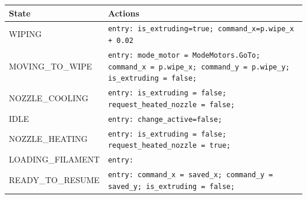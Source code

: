 \begin{tabular}{@{}lp{}@{}}
\toprule
State & Actions \\
\midrule
WIPING & \texttt{entry: is\_extruding=true; command\_x=p.wipe\_x + 0.02} \\
MOVING\_TO\_WIPE & \texttt{entry: mode\_motor = ModeMotors.GoTo; command\_x = p.wipe\_x; command\_y = p.wipe\_y; is\_extruding = false;} \\
NOZZLE\_COOLING & \texttt{entry: is\_extruding = false; request\_heated\_nozzle = false;} \\
IDLE & \texttt{entry: change\_active=false;} \\
NOZZLE\_HEATING & \texttt{entry: is\_extruding = false; request\_heated\_nozzle = true;} \\
LOADING\_FILAMENT & \texttt{entry:} \\
READY\_TO\_RESUME & \texttt{entry: command\_x = saved\_x; command\_y = saved\_y; is\_extruding = false;} \\
\bottomrule
\end{tabular}
